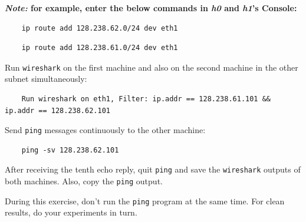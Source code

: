 \documentclass{UTNetLab}
\begin{document}
    \textbf {\textit{Note:} for example, enter the below commands in \textit{h0} and \textit{h1}'s Console: }
    
    \begin{lstlisting}
    ip route add 128.238.62.0/24 dev eth1
    \end{lstlisting}

    \begin{lstlisting}
    ip route add 128.238.61.0/24 dev eth1
    \end{lstlisting}
    
    Run \lstinline{wireshark} on the first machine and also on the second machine in the other subnet simultaneously:
    
    
    \begin{lstlisting}
    Run wireshark on eth1, Filter: ip.addr == 128.238.61.101 && ip.addr == 128.238.62.101
    \end{lstlisting}
    
    Send \lstinline{ping} messages continuously to the other machine:
    
    \begin{lstlisting}
    ping -sv 128.238.62.101
    \end{lstlisting}
    
    After receiving the tenth echo reply, quit \lstinline{ping} and save the \lstinline{wireshark} outputs of both machines.
    Also, copy the \lstinline{ping} output.

    During this exercise, don’t run the \lstinline{ping} program at the same time.
    For clean results, do your experiments in turn.
    
\end{document}

